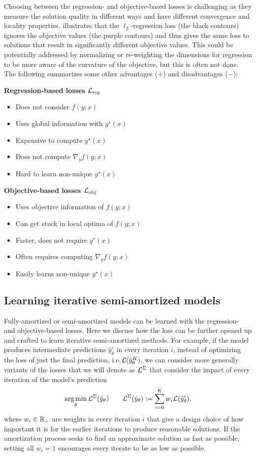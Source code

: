 \documentclass[twoside,11pt]{article}
\newcommand{\ie}{i.e.\xspace}
\newcommand\pro{\item[$+$]}
\newcommand\con{\item[$-$]}
\begin{document}
Choosing between the regression- and objective-based losses
is challenging as they measure the solution quality in
different ways and have different convergence and
locality properties.
 illustrates that the $\ell_2$-regression
loss (the black contours) ignores the objective
values (the purple contours) and thus gives the same loss
to solutions that result in significantly different
objective values.
This could be potentially addressed by normalizing or
re-weighting the dimensions for regression to be more aware
of the curvature of the objective, but this is often not done.
The following summarizes some other advantages ($+$) and
disadvantages ($-$):
\vspace{6mm}

\noindent
\begin{minipage}[t]{0.5\textwidth}
\noindent\textbf{Regression-based losses ${\mathcal{L}}_{\rm reg}$}
\begin{itemize}[leftmargin=*,noitemsep]
\con Does not consider $f(y; x)$
\pro Uses global information with $y^\star(x)$
\con Expensive to compute $y^\star(x)$
\pro Does not compute $\nabla_y f(y; x)$
\con Hard to learn non-unique $y^\star(x)$
\end{itemize}
\end{minipage}
\begin{minipage}[t]{0.5\textwidth}
\textbf{Objective-based losses ${\mathcal{L}}_{\rm obj}$}
\begin{itemize}[leftmargin=*,noitemsep]
\pro Uses objective information of $f(y; x)$
\con Can get stuck in local optima of $f(y; x)$
\pro Faster, does not require $y^\star(x)$
\con Often requires computing $\nabla_y f(y; x)$
\pro Easily learns non-unique $y^\star(x)$
\end{itemize}
\end{minipage}

\subsection{Learning iterative semi-amortized models}
\label{sec:learning:iter}

Fully-amortized or semi-amortized models can be learned
with the regression- and objective-based losses.
Here we discuss how the loss can be further opened up
and crafted to learn iterative semi-amortized methods.
For example, if the model produces intermediate predictions
$\hat y_\theta^i$ in every iteration $i$, instead of
optimizing the loss of just the final prediction,
\ie ${\mathcal{L}}(\hat y_\theta^K)$, we can consider more generally
variants of the losses that we will denote as
${\mathcal{L}}^\Sigma$ that consider the impact of every iteration
of the model's prediction
\begin{equation}
  \operatorname*{arg\,min}_\theta {\mathcal{L}}^\Sigma(\hat y_\theta) \qquad {\mathcal{L}}^\Sigma(\hat y_\theta) \vcentcolon= \sum_{i=0}^K w_i {\mathcal{L}}(\hat y_\theta^i),
\label{eq:iter-loss}
\end{equation}
where $w_i\in\mathbb{R}_+$ are weights in every iteration $i$
that give a design choice of how important
it is for the earlier iterations to produce reasonable
solutions.
If the amortization process seeks to find an approximate
solution as fast as possible, setting all $w_i=1$
encourages every iterate to be as low as possible.
\end{document}
